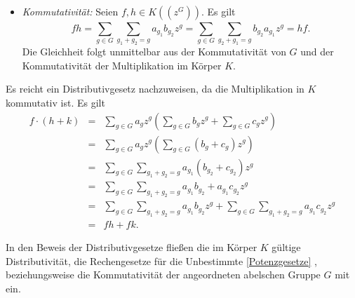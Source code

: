 {\begin{itemize}
%
%
%
%
\item \textit{Kommutativität:} Seien $f,h \in K\left(\left(z^{G}\right)\right)$. Es gilt 
\[fh = \sum_{g \in G}^{}\sum_{g_1 + g_2 = g}^{}a_{g_1} b_{g_2}z^g = \sum_{g \in G}^{}\sum_{g_2 + g_1 = g}^{}b_{g_2} a_{g_1}z^g = hf.\]
Die Gleichheit folgt unmittelbar aus der Kommutativität von $G$ und der Kommutativität der Multiplikation im Körper $K$.\\
\end{itemize}

Es reicht ein Distributivgesetz nachzuweisen, da die Multiplikation in $K$ kommutativ ist. Es gilt
\begin{eqnarray*}
f \cdot(h + k) &=& \sum_{g \in G}^{} a_g z^g  \left(\sum_{g \in G}^{} b_g z^g + \sum_{g \in G}^{} c_g z^g\right) \\
&=& \sum_{g \in G}^{} a_g z^g  \left(\sum_{g \in G}^{} \left(b_g + c_g\right) z^g \right)\\
&=& \sum_{g \in G}^{} \sum_{g_1 + g_2 = g}^{} a_{g_1}{\left(b_{g_2} + c_{g_2}\right)} z^g \\
&=& \sum_{g \in G}^{} \sum_{g_1 + g_2= g}^{} a_{g_1}b_{g_2} + a_{g_1}c_{g_2} z^g \\
&=& \sum_{g \in G}^{} \sum_{g_1 + g_2= g}^{} a_{g_1}b_{g_2}z^g + \sum_{g \in G}^{} \sum_{g_1 + g_2= g}^{} a_{g_1}c_{g_2} z^g \\
&=& fh + fk.
\end{eqnarray*}
%
%
%
% 
%
 
In den Beweis der Distributivgesetze fließen die im Körper $K$ gültige Distributivität, die Rechengesetze für die Unbestimmte \ref{Potenzgesetze}
, beziehungsweise die Kommutativität der angeordneten abelschen Gruppe $G$ mit ein.  
}
%
